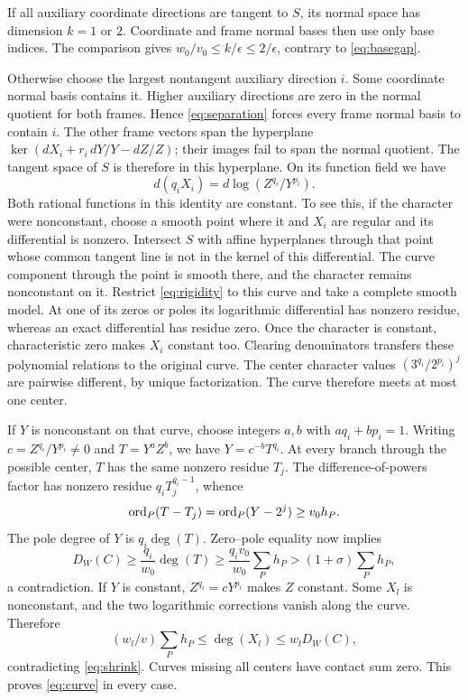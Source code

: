 If all auxiliary coordinate directions are tangent to \(S\), its normal
space has dimension \(k=1\) or \(2\). Coordinate and frame normal bases
then use only base indices. The comparison gives
\(w_0/v_0\leq k/\epsilon\leq2/\epsilon\), contrary to
\eqref{eq:basegap}.

Otherwise choose the largest nontangent auxiliary direction \(i\).
Some coordinate normal basis contains it. Higher auxiliary directions
are zero in the normal quotient for both frames. Hence
\eqref{eq:separation} forces every frame normal basis to contain \(i\).
The other frame vectors span the hyperplane
\(\ker(dX_i+r_i\,dY/Y-dZ/Z)\); their images fail to span the normal
quotient. The tangent space of \(S\) is therefore in this hyperplane.
On its function field we have
\begin{equation}\label{eq:rigidity}
             d(q_iX_i)=d\log(Z^{q_i}/Y^{p_i}).
\end{equation}
Both rational functions in this identity are constant. To see this,
if the character were nonconstant, choose a smooth point where it and
\(X_i\) are regular and its differential is nonzero. Intersect \(S\)
with affine hyperplanes through that point whose common tangent line
is not in the kernel of this differential. The curve component through
the point is smooth there, and the character remains nonconstant on it.
Restrict \eqref{eq:rigidity} to this curve and take a complete smooth model.
At one of its zeros or poles its logarithmic differential has nonzero
residue, whereas an exact differential has residue zero. Once the
character is constant, characteristic zero makes \(X_i\) constant too.
Clearing denominators transfers these polynomial relations to the
original curve. The center character values
\((3^{q_i}/2^{p_i})^j\) are pairwise different, by unique factorization.
The curve therefore meets at most one center.

If \(Y\) is nonconstant on that curve, choose integers \(a,b\) with
\(a q_i+b p_i=1\). Writing \(c=Z^{q_i}/Y^{p_i}\ne0\) and
\(T=Y^aZ^b\), we have \(Y=c^{-b}T^{q_i}\). At every branch through
the possible center, \(T\) has the same nonzero residue \(T_j\).
The difference-of-powers factor has nonzero residue
\(q_iT_j^{q_i-1}\), whence
\[
 \operatorname{ord}_P(T-T_j)=\operatorname{ord}_P(Y-2^j)\geq v_0h_P.
\]
The pole degree of \(Y\) is \(q_i\deg(T)\). Zero--pole equality now
implies
\[
 D_W(C)\geq\frac{q_i}{w_0}\deg(T)
       \geq\frac{q_i v_0}{w_0}\sum_Ph_P
       >(1+\sigma)\sum_Ph_P,
\]
a contradiction. If \(Y\) is constant, \(Z^{q_i}=cY^{p_i}\) makes
\(Z\) constant. Some \(X_l\) is nonconstant, and the two logarithmic
corrections vanish along the curve. Therefore
\[
 (w_l/v)\sum_Ph_P\leq\deg(X_l)\leq w_lD_W(C),
\]
contradicting \eqref{eq:shrink}. Curves missing all centers have contact
sum zero. This proves \eqref{eq:curve} in every case.

